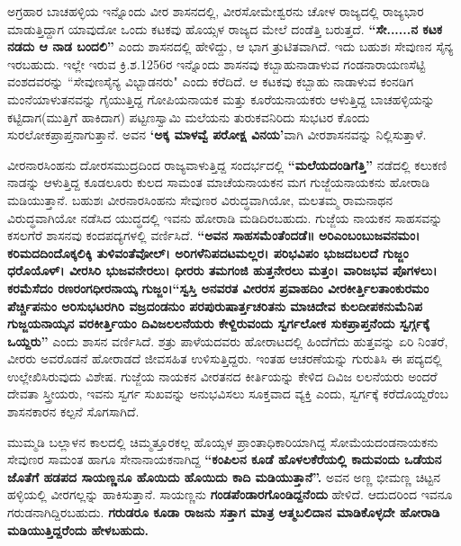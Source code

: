 ಅಗ್ರಹಾರ ಬಾಚಹಳ್ಳಿಯ ಇನ್ನೊಂದು ವೀರ ಶಾಸನದಲ್ಲಿ, ವೀರಸೋಮೇಶ್ವರನು ಚೋಳ ರಾಜ್ಯದಲ್ಲಿ ರಾಜ್ಯಭಾರ ಮಾಡುತ್ತಿದ್ದಾಗ ಯಾವುದೋ ಒಂದು ಕಟಕವು ಹೊಯ್ಸಳ ರಾಜ್ಯದ ಮೇಲೆ ದಂಡೆತ್ತಿ ಬರುತ್ತದೆ. \textbf{“ಸೇ......ನ ಕಟಕ ನಡದು ಆ ನಾಡ ಬಂದಲಿ”} ಎಂದು ಶಾಸನದಲ್ಲಿ ಹೇಳಿದ್ದು, ಆ ಭಾಗ ತ್ರುಟಿತವಾಗಿದೆ. ಇದು ಬಹುಶಃ ಸೇವುಣನ ಸೈನ್ಯ ಇರಬಹುದು. ಇಲ್ಲೇ ಇರುವ ಕ್ರಿ.ಶ.1256ರ ಇನ್ನೊಂದು ಶಾಸನವು ಕಬ್ಬಾಹುನಾಡಾಳುವ ಗಂಡನಾರಾಯಣಸೆಟ್ಟಿ ವಂಶದವರನ್ನು “ಸೇವುಣಸೈನ್ಯ ವಿಭ್ಬಾಡನರು" ಎಂದು ಕರೆದಿದೆ. ಆ ಕಟಕವು ಕಬ್ಬಾಹು ನಾಡಾಳುವ ಕಂನಡಿಗ ಮಂನೆಯಾಳುತನವನ್ನು ಗೈಯುತ್ತಿದ್ದ ಗೋಪಿಯನಾಯಕ ಮತ್ತು ಕೂರೆಯನಾಯಕರು ಆಳುತ್ತಿದ್ದ ಬಾಚಹಳ್ಳಿಯನ್ನು ಕಟ್ಟಿದಾಗ(ಮುತ್ತಿಗೆ ಹಾಕಿದಾಗ) ಪಟ್ಟಣಸ್ವಾಮಿ ಮಲೆಯನು ತುರುಕವನಿರಿದು ಸುಭಟರ ಕೊಂದು ಸುರಲೋಕಪ್ರಾಪ್ತನಾಗುತ್ತಾನೆ. ಅವನ \textbf{‘ಅಕ್ಕ ಮಾಳವ್ವೆ ಪರೋಕ್ಷ ವಿನಯ’}ವಾಗಿ ವೀರಶಾಸನವನ್ನು ನಿಲ್ಲಿಸುತ್ತಾಳೆ.

ವೀರನಾರಸಿಂಹನು ದೋರಸಮುದ್ರದಿಂದ ರಾಜ್ಯವಾಳುತ್ತಿದ್ದ ಸಂದರ್ಭದಲ್ಲಿ \textbf{“ಮಲೆಯದಂಡಿಗೆತ್ತಿ”} ನಡೆದಲ್ಲಿ ಕಲುಕಣಿ ನಾಡನ್ನು ಆಳುತ್ತಿದ್ದ ಕೂಡಲೂರು ಕುಲದ ಸಾಮಂತ ಮಾಚೆಯನಾಯಕನ ಮಗ ಗುಜ್ಜೆಯನಾಯಕನು ಹೋರಾಡಿ ಮಡಿಯುತ್ತಾನೆ. ಬಹುಶಃ ವೀರನಾರಸಿಂಹನು ಸೇವುಣರ ವಿರುದ್ಧವಾಗಿಯೋ, ಮಲತಮ್ಮ ರಾಮನಾಥನ ವಿರುದ್ಧವಾಗಿಯೋ ನಡೆಸಿದ ಯುದ್ಧದಲ್ಲಿ ಇವನು ಹೋರಾಡಿ ಮಡಿದಿರಬಹುದು. ಗುಜ್ಜೆಯ ನಾಯಕನ ಸಾಹಸವನ್ನು ಕಸಲಗೆರೆ ಶಾಸನವು ಕಂದಪದ್ಯಗಳಲ್ಲಿ ವರ್ಣಿಸಿದೆ. \textbf{“ಅವನ ಸಾಹಸಮೆಂತೆಂದಡೆ॥} \textbf{ಅರಿಎಂಬಂಬುಜವನಮಂ। ಕರಿಮದದಿಂದೊಕ್ಕಲಿಕ್ಕಿ ತುಳಿವಂತೆ\-ವೋಲ್​। ಅರಿಗಳೆನಿಪದಟಮಲ್ಲರ। ಪರಿಭವಿಪಂ ಭುಜದಬಲದೆ ಗುಜ್ಜಂ ಧರೊಯೊಳ್​। ವೀರಸಿರಿ ಭುಜವನೇರಲು। ಧೀರರು ತಮಗಂಜಿ ಹುತ್ತನೇರಲು ಮತ್ತಂ। ವಾರಿಜಭವ ಪೊಗಳಲು। ಕರಮೆಸೆದಂ ರಣರಂಗಧೀರನಾಯ್ಕ ಗುಜ್ಜಂ।“ಸ್ವಸ್ತಿ ಅನವರತ ವೀರರಸ ಪ್ರವಾಹದಿಂ ವೀರಕೀರ್ತ್ತಿಲತಾಂಕುರಮಂ ಪೆರ್ಚ್ಚಿಪನುಂ ಅರಿಸುಭಟರಗಿರಿ ವಜ್ರದಂಡನುಂ ಪರಪುರುಷಾರ್ತ್ತಚರಿತನು ಮಾಚಿದೇವ ಕುಲದೀಪಕನುಮೆನಿಪ ಗುಜ್ಜಯನಾಯ್ಕನ ವರಕೀರ್ತ್ತಿಯಂ ದಿವಿಜಲಲನೆಯರು ಕೇಳ್ದಿರುವಂದು ಸ್ವರ್ಗಲೋಕ ಸುಕಪ್ರಾಪ್ತನೆಂದು ಸ್ವರ್ಗ್ಗಕ್ಕೆ ಒಯ್ದರು”} ಎಂದು ಶಾಸನ ವರ್ಣಿಸಿದೆ. ಶತ್ರು ಪಾಳೆಯದವರು ಹೋರಾಟದಲ್ಲಿ ಹಿಂದೆಗೆದು ಹುತ್ತವನ್ನು ಏರಿ ನಿಂತರೆ, ವೀರರು ಅವರೊಡನೆ ಹೋರಾಡದೆ ಜೀವಸಹಿತ ಉಳಿಸುತ್ತಿದ್ದರು. ಇಂತಹ ಆಚರಣೆಯನ್ನು ಗುರುತಿಸಿ ಈ ಪದ್ಯದಲ್ಲಿ ಉಲ್ಲೇಖಿಸಿರುವುದು ವಿಶೇಷ. ಗುಜ್ಜೆಯ ನಾಯಕನ ವೀರತನದ ಕೀರ್ತಿಯನ್ನು ಕೇಳಿದ ದಿವಿಜ ಲಲನೆಯರು ಅಂದರೆ ದೇವತಾ ಸ್ತ್ರೀಯರು, ಇವನು ಸ್ವರ್ಗ ಸುಖವನ್ನು ಅನುಭವಿಸಲು ಸೂಕ್ತವಾದ ವ್ಯಕ್ತಿ ಎಂದು, ಸ್ವರ್ಗಕ್ಕೆ ಕರೆದೊಯ್ದರೆಂಬ ಶಾಸನಕಾರನ ಕಲ್ಪನೆ ಸೊಗಸಾಗಿದೆ.

ಮುಮ್ಮಡಿ ಬಲ್ಲಾಳನ ಕಾಲದಲ್ಲಿ ಚಿಮ್ಮತ್ತೂರಕಲ್ಲ ಹೊಯ್ಸಳ ಪ್ರಾಂತಾಧಿಕಾರಿಯಾಗಿದ್ದ ಸೋಮೆಯದಂಡನಾಯಕನು ಸೇವುಣರ ಸಾಮಂತ ಹಾಗೂ ಸೇನಾನಾಯಕನಾಗಿದ್ದ \textbf{“ಕಂಪಿಲನ ಕೂಡೆ ಹೊಳಲಕೆರೆಯಲ್ಲಿ ಕಾದುವಂದು ಒಡೆಯನ ಜೊತೆಗೆ ಹಡಪದ ಸಾಯಣ್ಣನೂ ಹೊಯಿದು ಹೊಯಿದು ಕಾದಿ ಮಡಿಯುತ್ತಾನೆ”.} ಅವನ ಅಣ್ಣ ಭೀಮಣ್ಣ ಚಿಟ್ಟನ ಹಳ್ಳಿಯಲ್ಲಿ ವೀರಗಲ್ಲನ್ನು ಹಾಕಿಸುತ್ತಾನೆ. ಸಾಯಣ್ಣನು \textbf{ಗಂಡಪೆಂಡಾರಗೊಂಡಿದ್ದನೆಂದು} ಹೇಳಿದೆ. ಆದುದರಿಂದ ಇವನೂ ಗರುಡನಾಗಿದ್ದಿರಬಹುದು. \textbf{ಗರುಡರೂ ಕೂಡಾ ರಾಜನು ಸತ್ತಾಗ ಮಾತ್ರ ಆತ್ಮಬಲಿದಾನ ಮಾಡಿಕೊಳ್ಳದೇ ಹೋರಾಡಿ ಮಡಿಯುತ್ತಿದ್ದರೆಂದು ಹೇಳಬಹುದು.}

